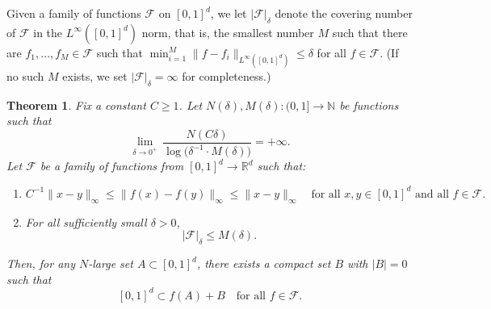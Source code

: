 \documentclass[12pt]{amsart}
\newtheorem{theorem}{Theorem}
\def\R{{\mathbb{R}}}
\def\N{{\mathbb{N}}}
\numberwithin{theorem}{section}
\numberwithin{equation}{section}
\begin{document}
Given a family of functions $\mathcal{F}$ on $[0,1]^d$, we let $|\mathcal{F}|_{\delta}$ denote the covering number of $\mathcal{F}$ in the $L^\infty([0,1]^d)$ norm, that is, the smallest number $M$ such that there are $f_1,\ldots,f_M\in\mathcal{F}$ such that $\min_{i=1}^M\|f-f_i\|_{L^\infty([0,1]^d)}\le \delta$ for all $f\in\mathcal{F}$. (If no such $M$ exists, we set $|\mathcal{F}|_{\delta}=\infty$ for completeness.)
\begin{theorem} \label{thm:technical-nonemptyinterior}
    Fix a constant $C\ge 1$. Let $N(\delta), M(\delta):(0,1]\to \N$ be functions such that
    \begin{equation} \label{eq:limit-N-M}
        \lim_{\delta\to 0^{+}} \,\frac{N(C\delta)}{\log \bigl(\delta^{-1}\cdot M(\delta)\bigr)} = +\infty.
    \end{equation}
    Let $\mathcal{F}$ be a family of functions from $[0,1]^d\to \R^d$ such that:
    \begin{enumerate}[label=\textup{(\Roman*)}]
        \item \label{it:I} 
        \[
            C^{-1}\|x-y\|_{\infty}\le \|f(x)-f(y)\|_\infty \le \|x-y\|_{\infty} \quad\text{for all }x,y\in [0,1]^d \text{ and all }f\in \mathcal{F}.
        \]
        \item  \label{it:II}
        For all sufficiently small $\delta>0$,
        \[
            |\mathcal{F}|_{\delta} \le M(\delta).
        \]
    \end{enumerate}


    Then, for any $N$-large set $A\subset [0,1]^d$, there exists a compact set $B$ with $|B|=0$ such that
    \[
        [0,1]^d\subset f(A)+B \quad\text{for all } f\in\mathcal{F}.
    \]
\end{theorem}
\end{document}
